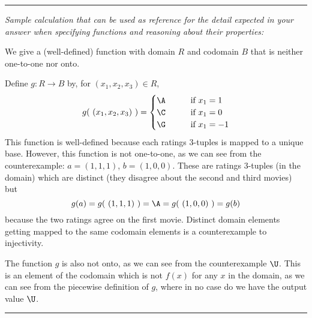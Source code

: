 \begin{enumerate}
    \rule{0.5\textwidth}{.4pt}

    {\it Sample calculation that can be used as reference for the detail expected 
    in your answer when specifying functions and reasoning about their properties:} 
    
    We give a (well-defined) function with domain $R$ and codomain $B$ that is neither one-to-one nor onto.

    Define $g: R \to B$ by, for $(x_1, x_2,x_3) \in R$,
    \[
        g(~(x_1, x_2, x_3)~) = \begin{cases} 
            \A \qquad &\text{if $x_1 = 1$} \\
            \C \qquad &\text{if $x_1 = 0$} \\
            \G \qquad &\text{if $x_1 = -1$}
        \end{cases}
    \]
    This function is well-defined because each ratings $3$-tuples is mapped to a unique base.
    However, this function is not one-to-one, as we can see from the counterexample: 
    $a = (1,1,1)$, $b = (1, 0,0)$. These are ratings $3$-tuples (in the domain) which are 
    distinct (they disagree about the second and third movies) but
    \[
        g(a) = g(~(1,1,1)~) = \A = g(~(1,0,0)~) = g(b)
    \]
    because the two ratings agree on the first movie. Distinct domain 
    elements getting mapped to the same codomain elements is a counterexample to injectivity.

    The function $g$ is also not onto, as we can see from the counterexample $\U$. This is an 
    element of the codomain which is not $f(x)$ for any $x$ in the domain, as we can see 
    from the piecewise definition of $g$, where in no case do we have the output value $\U$.
    \rule{0.5\textwidth}{.4pt}


\end{enumerate}


    
